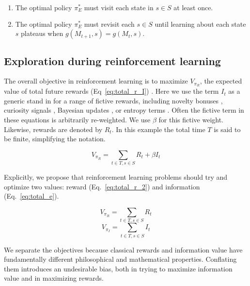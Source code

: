 \documentclass[9pt,twocolumn,twoside]{pnas-new}
\begin{document}
\begin{enumerate}[noitemsep,wide=0pt,leftmargin=\dimexpr\labelwidth+2\labelsep\relax]
    \item The optimal policy $\pi^*_E$ must visit each state in $s \in S$ at least once.
    \item The optimal policy $\pi^*_E$ must revisit each $s \in S$ until learning about each state $s$ plateaus when $g(M_{t+1}, s) = g(M_{t},s)$.
\end{enumerate}


\subsection*{Exploration during reinforcement learning}
The overall objective in reinforcement learning is to maximize $V_{\pi_R}$, the expected value of total future rewards (Eq~\ref{eq:total_r_I}) \cite{Sutton2018}. Here we use the term $I_t$ as a generic stand in for a range of fictive rewards, including novelty bonuses \cite{Kakade2002}, curiosity signals \cite{Pathak2017}, Bayesian updates \cite{Radulescu2019}, or entropy terms \cite{Haarnoja2015,Haarnoja2017}.  Often the fictive term in these equations is arbitrarily re-weighted. We use $\beta$ for this fictive weight. Likewise, rewards are denoted by $R_t$. In this example the total time $T$ is said to be finite, simplifying the notation.

\begin{equation}
    V_{\pi_R} = \sum_{t \in T, s \in S} R_t + \beta I_t
    \label{eq:total_r_I}
\end{equation}

Explicitly, we propose that reinforcement learning problems should try and optimize two values: reward (Eq.~\ref{eq:total_r_2}) and information (Eq.~\ref{eq:total_e}). 

\begin{multicols}{2}
  \begin{equation}
    V_{\pi_R} = \sum_{t \in T, s \in S} R_t
    \label{eq:total_r_2}
  \end{equation} \break
  \begin{equation}
    V_{\pi_I} = \sum_{t \in T, s \in S} I_t
    \label{eq:total_e}
  \end{equation}
\end{multicols}

We separate the objectives because classical rewards and information value have fundamentally different philosophical and mathematical properties. Conflating them introduces an undesirable bias, both in trying to maximize information value and in maximizing rewards.
\end{document}
